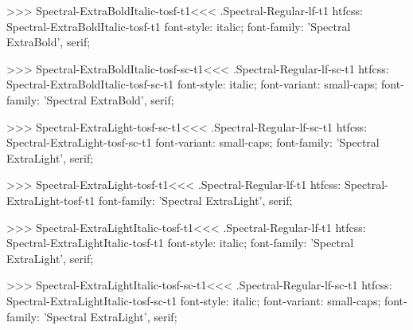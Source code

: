 >>>
\<Spectral-ExtraBoldItalic-tosf-t1\><<<
.Spectral-Regular-lf-t1
htfcss:  Spectral-ExtraBoldItalic-tosf-t1  font-style: italic; font-family: 'Spectral ExtraBold', serif;

>>>
\<Spectral-ExtraBoldItalic-tosf-sc-t1\><<<
.Spectral-Regular-lf-sc-t1
htfcss:  Spectral-ExtraBoldItalic-tosf-sc-t1  font-style: italic; font-variant: small-caps; font-family: 'Spectral ExtraBold', serif;

>>>
\<Spectral-ExtraLight-tosf-sc-t1\><<<
.Spectral-Regular-lf-sc-t1
htfcss:  Spectral-ExtraLight-tosf-sc-t1  font-variant: small-caps; font-family: 'Spectral ExtraLight', serif;

>>>
\<Spectral-ExtraLight-tosf-t1\><<<
.Spectral-Regular-lf-t1
htfcss:  Spectral-ExtraLight-tosf-t1  font-family: 'Spectral ExtraLight', serif;

>>>
\<Spectral-ExtraLightItalic-tosf-t1\><<<
.Spectral-Regular-lf-t1
htfcss:  Spectral-ExtraLightItalic-tosf-t1  font-style: italic; font-family: 'Spectral ExtraLight', serif;

>>>
\<Spectral-ExtraLightItalic-tosf-sc-t1\><<<
.Spectral-Regular-lf-sc-t1
htfcss:  Spectral-ExtraLightItalic-tosf-sc-t1  font-style: italic; font-variant: small-caps; font-family: 'Spectral ExtraLight', serif;

